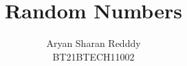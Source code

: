 \documentclass[journal,12pt,twocolumn]{IEEEtran}
\begin{document}
\providecommand{\dec}[2]{\ensuremath{\overset{#1}{\underset{#2}{\gtrless}}}}
\DeclarePairedDelimiter{\ceil}{\lceil}{\rceil}
\makeatletter
{}
\makeatother
\renewcommand{\thefigure}{\arabic{section}.\arabic{figure}}
\let\StandardTheFigure\thefigure
\let\StandardTheTable\thetable
\let\vec\mathbf
{}
\vspace{3cm}
\title{%
	Random Numbers
}
%
%
%
\author{Aryan Sharan Redddy\\ BT21BTECH11002}
\maketitle
\tableofcontents
\bigskip

\end{document}
